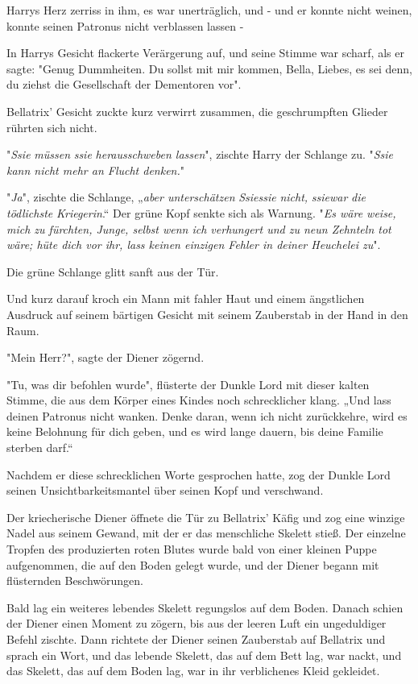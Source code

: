 {Harrys Herz zerriss in ihm, es war unerträglich, und - und er konnte nicht weinen, konnte seinen Patronus nicht verblassen lassen -

In Harrys Gesicht flackerte Verärgerung auf, und seine Stimme war scharf, als er sagte: "Genug Dummheiten. Du sollst mit mir kommen, Bella, Liebes, es sei denn, du ziehst die Gesellschaft der Dementoren vor".

Bellatrix' Gesicht zuckte kurz verwirrt zusammen, die geschrumpften Glieder rührten sich nicht.

"\emph{Ssie} \emph{müssen} \emph{ssie} \emph{herausschweben lassen}", zischte Harry der Schlange zu. "\emph{Ssie} \emph{kann nicht mehr an Flucht denken.}"

"\emph{Ja}", zischte die Schlange, „\emph{aber unterschätzen} \emph{Ssiessie} \emph{nicht,} \emph{ssiewar} \emph{die tödlichste} \emph{Kriegerin}.“ Der grüne Kopf senkte sich als Warnung. "\emph{Es wäre weise, mich zu fürchten, Junge, selbst wenn ich verhungert und zu neun Zehnteln tot wäre; hüte dich vor ihr, lass keinen einzigen Fehler in deiner Heuchelei zu}".

Die grüne Schlange glitt sanft aus der Tür.

Und kurz darauf kroch ein Mann mit fahler Haut und einem ängstlichen Ausdruck auf seinem bärtigen Gesicht mit seinem Zauberstab in der Hand in den Raum.

"Mein Herr?", sagte der Diener zögernd.

"Tu, was dir befohlen wurde", flüsterte der Dunkle Lord mit dieser kalten Stimme, die aus dem Körper eines Kindes noch schrecklicher klang. „Und lass deinen Patronus nicht wanken. Denke daran, wenn ich nicht zurückkehre, wird es keine Belohnung für dich geben, und es wird lange dauern, bis deine Familie sterben darf.“

Nachdem er diese schrecklichen Worte gesprochen hatte, zog der Dunkle Lord seinen Unsichtbarkeitsmantel über seinen Kopf und verschwand.

Der kriecherische Diener öffnete die Tür zu Bellatrix' Käfig und zog eine winzige Nadel aus seinem Gewand, mit der er das menschliche Skelett stieß. Der einzelne Tropfen des produzierten roten Blutes wurde bald von einer kleinen Puppe aufgenommen, die auf den Boden gelegt wurde, und der Diener begann mit flüsternden Beschwörungen.

Bald lag ein weiteres lebendes Skelett regungslos auf dem Boden. Danach schien der Diener einen Moment zu zögern, bis aus der leeren Luft ein ungeduldiger Befehl zischte. Dann richtete der Diener seinen Zauberstab auf Bellatrix und sprach ein Wort, und das lebende Skelett, das auf dem Bett lag, war nackt, und das Skelett, das auf dem Boden lag, war in ihr verblichenes Kleid gekleidet.

}
